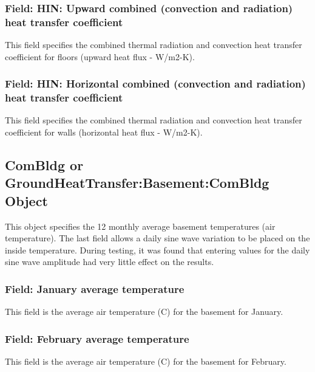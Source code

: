 \subsubsection{Field: HIN: Upward combined (convection and radiation) heat transfer coefficient}\label{field-hin-upward-combined-convection-and-radiation-heat-transfer-coefficient}

This field specifies the combined thermal radiation and convection heat transfer coefficient for floors (upward heat flux - W/m2-K).

\subsubsection{Field: HIN: Horizontal combined (convection and radiation) heat transfer coefficient}\label{field-hin-horizontal-combined-convection-and-radiation-heat-transfer-coefficient}

This field specifies the combined thermal radiation and convection heat transfer coefficient for walls (horizontal heat flux - W/m2-K).

\subsection{ComBldg or GroundHeatTransfer:Basement:ComBldg Object}\label{combldg-or-groundheattransferbasementcombldg-object}

This object specifies the 12 monthly average basement temperatures (air temperature). The last field allows a daily sine wave variation to be placed on the inside temperature. During testing, it was found that entering values for the daily sine wave amplitude had very little effect on the results.

\subsubsection{Field: January average temperature}\label{field-january-average-temperature}

This field is the average air temperature (C) for the basement for January.

\subsubsection{Field: February average temperature}\label{field-february-average-temperature}

This field is the average air temperature (C) for the basement for February.

